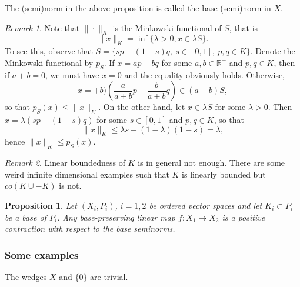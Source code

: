 \documentclass[12pt]{article}
\newtheorem{prop}{Proposition}
\theoremstyle{remark}
\newtheorem{rem}{Remark}
\newcommand{\<}{\langle}
\begin{document}
The (semi)norm in the above proposition  is called  the base (semi)norm in $X$. 

\begin{rem}
Note that $\|\cdot\|_K$ is the Minkowski functional of $S$, that is
\[
\|x\|_K= \inf\{\lambda>0, x\in \lambda S\}.
\]
To see this, observe that $S=\{s p-(1-s)q,\ s\in [0,1],\ p,q\in K\}$. Denote the Minkowski functional by $p_S$. If $x=ap-bq$ for some $a,b\in \mathbb R^+$ and $p,q\in K$, then if $a+b=0$, we must have 
$x=0$ and the equality obviously holds. Otherwise, 
\[
x= +b)(\frac a{a+b} p-\frac b{a+b} q)\in (a+b) S,
\]
so that $p_S(x)\le \|x\|_K$. On the other hand, let $x\in \lambda S$ for some $\lambda>0$. Then $x=\lambda(sp-(1-s)q)$ for some $s\in [0,1]$ and $p,q\in K$, so that 
\[
\|x\|_K\le \lambda s+(1-\lambda)(1-s)=\lambda,
\]
hence $\|x\|_K\le p_S(x)$.   
\end{rem}




\begin{rem} Linear boundedness of $K$ is in general not enough. There are some weird infinite dimensional examples such that $K$ is linearly bounded but $co(K\cup -K)$ is not.

\end{rem}



\begin{prop} Let $(X_i,P_i)$, $i=1,2$ be ordered vector spaces and let $K_i\subset P_i$ be a base of $P_i$. 
 Any base-preserving linear  map $f:X_1\to X_2$ is a positive contraction with respect to the base seminorms.
\end{prop}

\subsubsection*{Some examples}

The wedges $X$ and $\{0\}$ are trivial.
\end{document}
